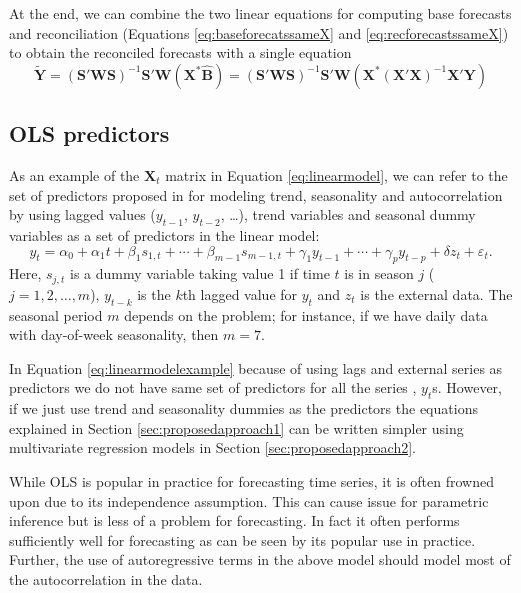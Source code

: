 \documentclass[11pt,a4paper,]{article}
\begin{document}
At the end, we can combine the two linear equations for computing base forecasts and reconciliation (Equations \eqref{eq:baseforecatssameX} and \eqref{eq:recforecastssameX}) to obtain the reconciled forecasts with a single equation
\begin{equation}\label{eq:singlestepsameX}
\tilde{\bm{Y}} = (\bm{S}'\bm{W}\bm{S})^{-1}\bm{S}'\bm{W}
                        (\bm{X}^* \hat{\bm{B}})
                        = (\bm{S}'\bm{W}\bm{S})^{-1}\bm{S}'\bm{W}
                        (\bm{X}^* (\bm{X}'\bm{X})^{-1} \bm{X}'\bm{Y})
\end{equation}

\hypertarget{ols-predictors}{%
\subsection{OLS predictors}\label{ols-predictors}}

As an example of the \(\bm{X}_t\) matrix in Equation \eqref{eq:linearmodel}, we can refer to the set of predictors proposed in \textcite{ashouri2018} for modeling trend, seasonality and autocorrelation by using lagged values (\(y_{t-1}\), \(y_{t-2}\), \dots), trend variables and seasonal dummy variables as a set of predictors in the linear model:
\begin{equation}\label{eq:linearmodelexample}
    y_t = \alpha_0 + \alpha_1 t + \beta_1 s_{1,t} + \cdots + \beta_{m-1} s_{m-1,t} + \gamma_1 y_{t-1} + \cdots + \gamma_p y_{t-p} + \delta z_t + \varepsilon_t.
\end{equation}
Here, \(s_{j,t}\) is a dummy variable taking value 1 if time \(t\) is in season \(j\) (\(j=1, 2, \dots, m\)), \(y_{t-k}\) is the \(k\)th lagged value for \(y_t\) and \(z_t\) is the external data. The seasonal period \(m\) depends on the problem; for instance, if we have daily data with day-of-week seasonality, then \(m=7\).

In Equation \eqref{eq:linearmodelexample} because of using lags and external series as predictors we do not have same set of predictors for all the series , \(y_t\)s. However, if we just use trend and seasonality dummies as the predictors the equations explained in Section \ref{sec:proposedapproach1} can be written simpler using multivariate regression models in Section \ref{sec:proposedapproach2}.

While OLS is popular in practice for forecasting time series, it is often frowned upon due to its independence assumption. This can cause issue for parametric inference but is less of a problem for forecasting. In fact it often performs sufficiently well for forecasting as can be seen by its popular use in practice. Further, the use of autoregressive terms in the above model should model most of the autocorrelation in the data.
\end{document}
